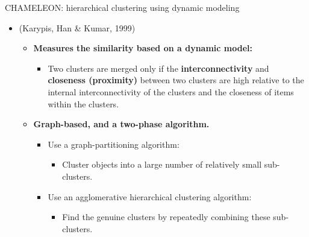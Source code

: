 \documentclass[aspectratio=169,t,xcolor=dvipsnames]{beamer}
\begin{document}
  { %
    \begin{frame}{CHAMELEON: hierarchical clustering using dynamic modeling}
      \begin{itemize}
        \item (Karypis, Han \& Kumar, 1999)
        \begin{itemize}
          \item \textbf{Measures the similarity based on a dynamic model:}
          \begin{itemize}
            \item Two clusters are merged only if the \textbf{interconnectivity} and \textbf{closeness (proximity)} between two clusters are high relative to the internal interconnectivity of the clusters and the closeness of items within the clusters.
          \end{itemize}
          \item \textbf{Graph-based, and a two-phase algorithm.}
          \begin{itemize}
            \item Use a graph-partitioning algorithm:
            \begin{itemize}
              \item Cluster objects into a large number of relatively small sub-clusters.
            \end{itemize}
            \item Use an agglomerative hierarchical clustering algorithm:
            \begin{itemize}
              \item Find the genuine clusters by repeatedly combining these sub-clusters.
            \end{itemize}
          \end{itemize}
        \end{itemize}
      \end{itemize}
    \end{frame}
  }
\end{document}
